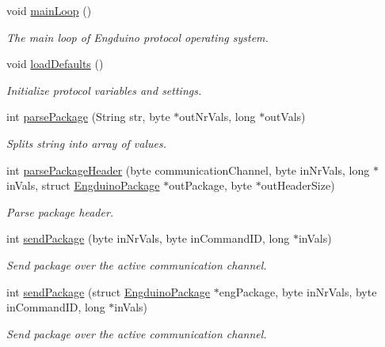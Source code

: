 \begin{DoxyCompactItemize}
void \hyperlink{group___engduino_protocol_ga69274ee75df14c92966878a83248f89e}{main\+Loop} ()
\begin{DoxyCompactList}\small\item\em The main loop of Engduino protocol operating system. \end{DoxyCompactList}\item 
void \hyperlink{group___engduino_protocol_gaabeaf6ca75e6f6bbdc3cd9b42f4b8015}{load\+Defaults} ()
\begin{DoxyCompactList}\small\item\em Initialize protocol variables and settings. \end{DoxyCompactList}\item 
int \hyperlink{group___engduino_protocol_ga13412494933a3beaaee8f41fb52b1128}{parse\+Package} (String str, byte $\ast$out\+Nr\+Vals, long $\ast$out\+Vals)
\begin{DoxyCompactList}\small\item\em Splits string into array of values. \end{DoxyCompactList}\item 
int \hyperlink{group___engduino_protocol_ga0572419c0b4aaa6f8f0849271787f2b4}{parse\+Package\+Header} (byte communication\+Channel, byte in\+Nr\+Vals, long $\ast$in\+Vals, struct \hyperlink{struct_engduino_package}{Engduino\+Package} $\ast$out\+Package, byte $\ast$out\+Header\+Size)
\begin{DoxyCompactList}\small\item\em Parse package header. \end{DoxyCompactList}\item 
int \hyperlink{group___engduino_protocol_gadddb537a6ab657e219d4bbd0d33f79ff}{send\+Package} (byte in\+Nr\+Vals, byte in\+Command\+I\+D, long $\ast$in\+Vals)
\begin{DoxyCompactList}\small\item\em Send package over the active communication channel. \end{DoxyCompactList}\item 
int \hyperlink{group___engduino_protocol_gaaf4947d0670da27bdab07065b6cc56b6}{send\+Package} (struct \hyperlink{struct_engduino_package}{Engduino\+Package} $\ast$eng\+Package, byte in\+Nr\+Vals, byte in\+Command\+I\+D, long $\ast$in\+Vals)
\begin{DoxyCompactList}\small\item\em Send package over the active communication channel. \end{DoxyCompactList}\item 

\end{DoxyCompactItemize}
